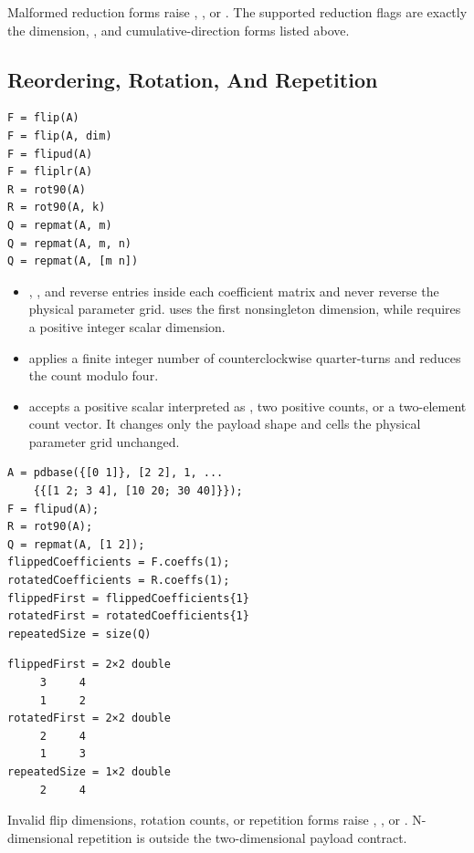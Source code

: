 \remarkshead
Malformed reduction forms raise , , or . The supported reduction flags are exactly the dimension, , and cumulative-direction forms listed above.

\subsection{Reordering, Rotation, And Repetition}
\label{sec:pdbase-matrix-reordering}

\syntaxhead
\begin{lstlisting}[style=dpsyntax]
F = flip(A)
F = flip(A, dim)
F = flipud(A)
F = fliplr(A)
R = rot90(A)
R = rot90(A, k)
Q = repmat(A, m)
Q = repmat(A, m, n)
Q = repmat(A, [m n])
\end{lstlisting}

\descriptionhead
\begin{itemize}[leftmargin=*]
    \item {}, , and  reverse entries inside each coefficient matrix and never reverse the physical parameter grid.  uses the first nonsingleton dimension, while  requires a positive integer scalar dimension.
    \item {} applies a finite integer number of counterclockwise quarter-turns and reduces the count modulo four.
    \item {} accepts a positive scalar interpreted as \code{[m m]}, two positive counts, or a two-element count vector. It changes only the payload shape and cells the physical parameter grid unchanged.
\end{itemize}

\examplehead
\begin{lstlisting}[style=dpmatlab]
A = pdbase({[0 1]}, [2 2], 1, ...
    {{[1 2; 3 4], [10 20; 30 40]}});
F = flipud(A);
R = rot90(A);
Q = repmat(A, [1 2]);
flippedCoefficients = F.coeffs(1);
rotatedCoefficients = R.coeffs(1);
flippedFirst = flippedCoefficients{1}
rotatedFirst = rotatedCoefficients{1}
repeatedSize = size(Q)
\end{lstlisting}
\begin{lstlisting}[style=dpoutput]
flippedFirst = 2×2 double
     3     4
     1     2
rotatedFirst = 2×2 double
     2     4
     1     3
repeatedSize = 1×2 double
     2     4
\end{lstlisting}

\remarkshead
Invalid flip dimensions, rotation counts, or repetition forms raise , , or . N-dimensional repetition is outside the two-dimensional payload contract.

